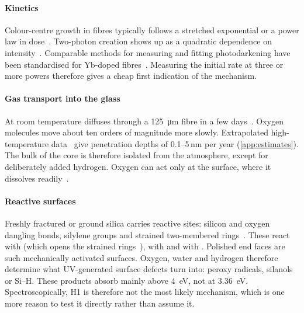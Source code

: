 \paragraph{Kinetics} Colour-centre growth in fibres typically follows a stretched exponential or a
power law in dose~\cite{Griscom1993,Griscom2001}. Two-photon creation shows up as a quadratic
dependence on intensity~\cite{Arai1988,Tsai1988}. Comparable methods for measuring and fitting
photodarkening have been standardised for Yb-doped fibres~\cite{Koponen2006,Koponen2008,Jetschke2007}.
Measuring the initial rate at three or more powers therefore gives a cheap first indication of the
mechanism.

\paragraph{Gas transport into the glass} At room temperature \Htwo{} diffuses through a
\SI{125}{\micro m} fibre in a few days~\cite{Lemaire1991,Shang2009}. Oxygen molecules move about ten
orders of magnitude more slowly. Extrapolated high-temperature data~\cite{Norton1961,Kajihara2010} give
penetration depths of 0.1--5\,nm per year (\cref{app:estimates}). The bulk of the core is therefore
isolated from the atmosphere, except for deliberately added hydrogen. Oxygen can act only at the
surface, where it dissolves readily~\cite{Kajihara2004c}.

\paragraph{Reactive surfaces} Freshly fractured or ground silica carries reactive sites: silicon and
oxygen dangling bonds, silylene groups and strained two-membered rings~\cite{Radzig1993,Radzig1998,Radzig2000,Ceresoli2000}.
These react with \water{} (which opens the strained rings~\cite{Rimola2008}), with \Htwo{} and with
\Oxy{}. Polished end faces are such mechanically activated surfaces. Oxygen, water and hydrogen
therefore determine what UV-generated surface defects turn into: peroxy radicals, silanols or Si--H.
These products absorb mainly above \SI{4}{eV}, not at \SI{3.36}{eV}. Spectroscopically, H1 is therefore
not the most likely mechanism, which is one more reason to test it directly rather than assume it.


